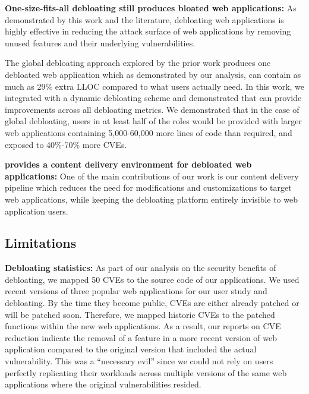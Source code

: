 \noindent\textbf{One-size-fits-all debloating still produces bloated web applications:} 
As demonstrated by this work and the literature, debloating web applications is highly effective in reducing the attack surface of web applications by removing unused features and their underlying vulnerabilities. 

The global debloating approach explored by the prior work produces one debloated web application which as demonstrated by our analysis, can contain as much as 29\% extra LLOC compared to what users actually need. 
In this work, we integrated \dbltr{} with a dynamic debloating scheme and demonstrated that \dbltr{} can provide improvements across all debloating metrics. 
We demonstrated that in the case of global debloating, users in at least half of the roles would be provided with larger web applications containing 5,000-60,000 more lines of code than required, and exposed to 40\%-70\% more CVEs.


\noindent\textbf{\dbltr{} provides a content delivery environment for debloated web applications:} 
One of the main contributions of our work is our content delivery pipeline which reduces the need for modifications and customizations to target web applications, while keeping the debloating platform entirely invisible to web application users.

\subsection{Limitations} 


\noindent\textbf{Debloating statistics: }
As part of our analysis on the security benefits of debloating, we mapped 50 CVEs to the source code of our applications. 
We used recent versions of three popular web applications for our user study and debloating.
By the time they become public, CVEs are either already patched or will be patched soon. 
Therefore, we mapped historic CVEs to the patched functions within the new web applications. 
As a result, our reports on CVE reduction indicate the removal of a feature in a more recent version of web application compared to the original version that included the actual vulnerability. This was a ``necessary evil'' since we could not rely on users perfectly replicating their workloads across multiple versions of the same web applications where the original vulnerabilities resided.

